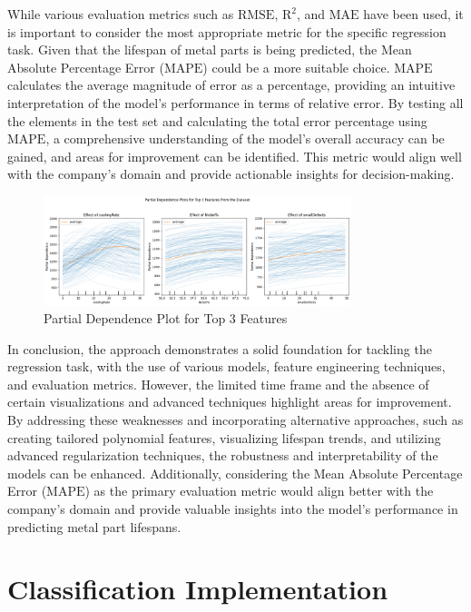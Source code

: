 \documentclass{article}
\begin{document}
While various evaluation metrics such as $\text{RMSE}$, $\text{R}^2$, and $\text{MAE}$ have been used, it is important to consider the most appropriate metric for the specific regression task. Given that the lifespan of metal parts is being predicted, the Mean Absolute Percentage Error ($\text{MAPE}$) could be a more suitable choice. $\text{MAPE}$ calculates the average magnitude of error as a percentage, providing an intuitive interpretation of the model's performance in terms of relative error. By testing all the elements in the test set and calculating the total error percentage using $\text{MAPE}$, a comprehensive understanding of the model's overall accuracy can be gained, and areas for improvement can be identified. This metric would align well with the company's domain and provide actionable insights for decision-making.

\begin{figure}[htbp]
    \centering
    \includegraphics[width=0.8\textwidth]{./Images/PartialDependence-Top3.png}
    \caption{Partial Dependence Plot for Top 3 Features}
    \label{fig:partial_dependence_top3}
\end{figure}

In conclusion, the approach demonstrates a solid foundation for tackling the regression task, with the use of various models, feature engineering techniques, and evaluation metrics. However, the limited time frame and the absence of certain visualizations and advanced techniques highlight areas for improvement. By addressing these weaknesses and incorporating alternative approaches, such as creating tailored polynomial features, visualizing lifespan trends, and utilizing advanced regularization techniques, the robustness and interpretability of the models can be enhanced. Additionally, considering the Mean Absolute Percentage Error ($\text{MAPE}$) as the primary evaluation metric would align better with the company's domain and provide valuable insights into the model's performance in predicting metal part lifespans.

\section{Classification Implementation}
\end{document}
